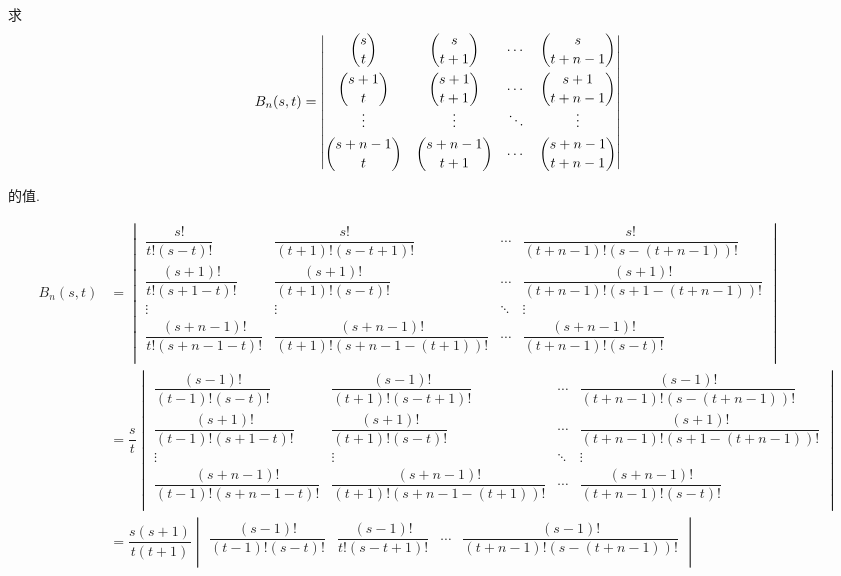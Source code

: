 \documentclass[color=black,device=normal,lang=cn,mode=geye]{elegantnote}
\begin{document}
\begin{exercise}%
    求
    \[B_n(s,t)=\begin{vmatrix}
        \dbinom{s}{t} & \dbinom{s}{t+1} & \cdots & \dbinom{s}{t+n-1} \\[10pt]
        \dbinom{s+1}{t} & \dbinom{s+1}{t+1} & \cdots & \dbinom{s+1}{t+n-1} \\
        \vdots & \vdots & \ddots & \vdots \\[4pt]
        \dbinom{s+n-1}{t} & \dbinom{s+n-1}{t+1} & \cdots & \dbinom{s+n-1}{t+n-1} \\
    \end{vmatrix}\]

    的值.
\end{exercise}
\begin{landscape}
\begin{solution}
    \begin{align*}
        B_n(s,t) & =\begin{vmatrix}
            \dfrac{s!}{t!(s-t)!} & \dfrac{s!}{(t+1)!(s-t+1)!} & \cdots & \dfrac{s!}{(t+n-1)!(s-(t+n-1))!} \\[10pt]
            \dfrac{(s+1)!}{t!(s+1-t)!} & \dfrac{(s+1)!}{(t+1)!(s-t)!} & \cdots & \dfrac{(s+1)!}{(t+n-1)!(s+1-(t+n-1))!} \\
            \vdots & \vdots & \ddots & \vdots \\[4pt]
            \dfrac{(s+n-1)!}{t!(s+n-1-t)!} & \dfrac{(s+n-1)!}{(t+1)!(s+n-1-(t+1))!} & \cdots & \dfrac{(s+n-1)!}{(t+n-1)!(s-t)!} \\
        \end{vmatrix} \\
        & =\dfrac{s}{t}\begin{vmatrix}
            \dfrac{(s-1)!}{(t-1)!(s-t)!} & \dfrac{(s-1)!}{(t+1)!(s-t+1)!} & \cdots & \dfrac{(s-1)!}{(t+n-1)!(s-(t+n-1))!} \\[10pt]
            \dfrac{(s+1)!}{(t-1)!(s+1-t)!} & \dfrac{(s+1)!}{(t+1)!(s-t)!} & \cdots & \dfrac{(s+1)!}{(t+n-1)!(s+1-(t+n-1))!} \\
            \vdots & \vdots & \ddots & \vdots \\[4pt]
            \dfrac{(s+n-1)!}{(t-1)!(s+n-1-t)!} & \dfrac{(s+n-1)!}{(t+1)!(s+n-1-(t+1))!} & \cdots & \dfrac{(s+n-1)!}{(t+n-1)!(s-t)!} \\
        \end{vmatrix} \\
        & =\dfrac{s(s+1)}{t(t+1)}\begin{vmatrix}
            \dfrac{(s-1)!}{(t-1)!(s-t)!} & \dfrac{(s-1)!}{t!(s-t+1)!} & \cdots & \dfrac{(s-1)!}{(t+n-1)!(s-(t+n-1))!} \\[10pt]

\end{vmatrix}
\end{align*}
\end{solution}
\end{landscape}
\end{document}
